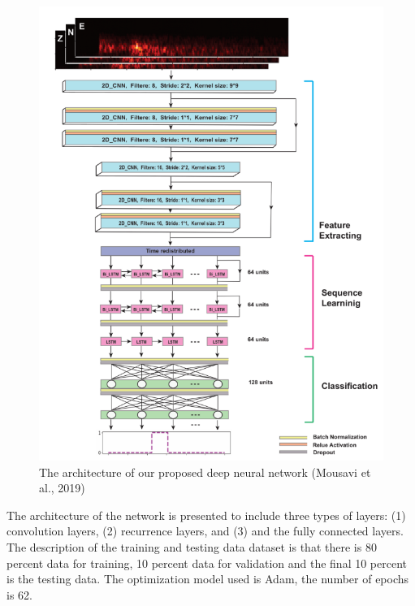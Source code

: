 \begin{figure}
    \centering
    \includegraphics[scale=0.6]{images/NNarchi.png}
    \caption{The architecture of our proposed deep neural network (Mousavi et al., 2019)}
    \label{fig:NNarchi}
\end{figure}

The architecture of the network is presented to include three types of layers: (1) convolution layers, (2) recurrence layers, and (3) and the fully connected layers. The description of the training and testing data dataset is that there is 80 percent data for training, 10 percent data for validation and the final 10 percent is the testing data. The optimization model used is Adam, the number of epochs is 62. 


